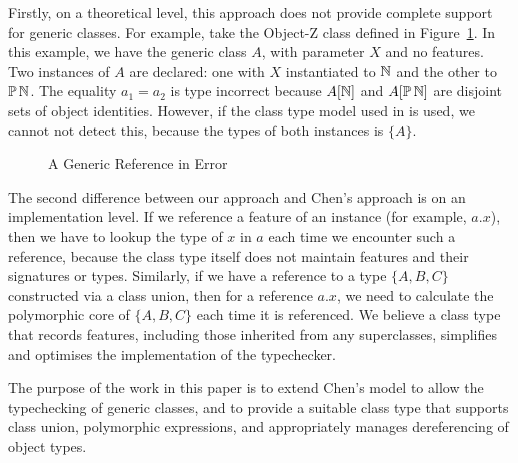 Firstly, on a theoretical level, this approach does not provide
complete support for generic classes. For
example, take the Object-Z class defined in
Figure~\ref{generic-class-A}.  In this example, we have the generic
class $A$, with parameter $X$ and no features.  Two
instances of $A$ are declared: one with $X$ instantiated to ${\mathbb N}$ and
the other to $\power \nat$. The equality $a_{1} = a_{2}$ is type
incorrect because $A[{\mathbb N}]$ and $A[\power \nat]$ are disjoint sets of
object identities. However, if the class type model used in
\cite{chen94} is used, we cannot not detect this, because the types of
both instances is $\{A\}$.

\begin{figure}[t]

\caption{A Generic Reference in Error}
\label{generic-class-A}
\end{figure}


The second difference between our approach and Chen's approach is on
an implementation level. If we reference a feature of an instance (for
example, $a.x$), then we have to lookup the type of $x$ in $a$ each
time we encounter such a reference, because the class type itself does
not maintain features and their signatures or types.  Similarly, if we
have a reference to a type $\{ A, B, C\}$ constructed via a class
union, then for a reference $a.x$, we need to calculate the
polymorphic core of $\{A,B,C\}$ each time it is referenced. We believe
a class type that records features, including those inherited from any
superclasses, simplifies and optimises the implementation of the
typechecker.

The purpose of the work in this paper is to extend Chen's model to
allow the typechecking of generic classes, and to provide a suitable
class type that supports class union, polymorphic expressions, and
appropriately manages dereferencing of object types.
